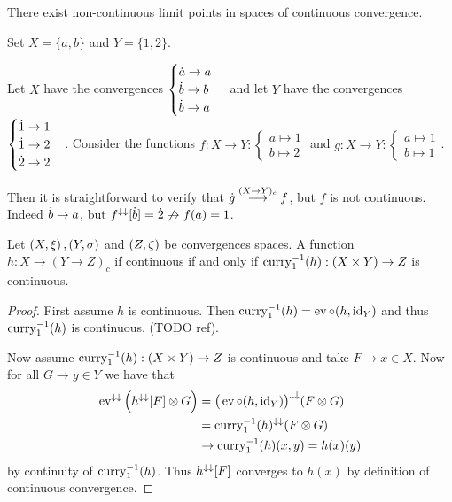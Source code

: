 \begin{example}
There exist non-continuous limit points in spaces of continuous convergence.

Set $X = \{a,b\}$ and $Y = \{1,2\}$.

Let $X$ have the convergences $\begin{cases}
\dot{a} \to a \\
\dot{b} \to b \\
\dot{b} \to a
\end{cases}$ and let $Y$ have the convergences $\begin{cases}
\dot{1} \to 1 \\
\dot{1} \to 2 \\
\dot{2} \to 2
\end{cases}$.
Consider the functions $f: X\to Y: \begin{cases}
a\mapsto 1 \\ b\mapsto 2
\end{cases}$ and $g: X\to Y: \begin{cases}
a\mapsto 1 \\ b\mapsto 1
\end{cases}$.

Then it is straightforward to verify that $\dot{g} \overset{(X\to Y)_c}{\longrightarrow} f$, but $f$ is not continuous. Indeed $\dot{b} \to a$, but $f^{\downarrow\downarrow}[\dot{b}] = \dot{2} \not\to f(a) = 1$.
\end{example}

\begin{proposition} \label{universalPropertyContinuousConvergence}
Let $\left( X, \xi \right), \left( Y,\sigma \right)$ and $\left( Z,\zeta \right)$ be convergences spaces. A function $h: X\to (Y \to Z)_c$ if continuous \textup{if and only if} $\operatorname{curry}_1^{-1}(h): (X\times Y)\to Z$ is continuous.
\end{proposition}
\begin{proof}
First assume $h$ is continuous. Then $\operatorname{curry}_1^{-1}(h) = \operatorname{ev} \circ (h,\operatorname{id}_Y)$ and thus $\operatorname{curry}_1^{-1}(h)$ is continuous. (TODO ref).

Now assume $\operatorname{curry}_1^{-1}(h): (X\times Y)\to Z$ is continuous and take $F\to x\in X$. Now for all $G\to y\in Y$ we have that
\begin{align*}
\operatorname{ev}^{\downarrow\downarrow}\Big(h^{\downarrow\downarrow}[F]\otimes G\Big) &= \big(\operatorname{ev} \circ (h,\operatorname{id}_Y)\big)^{\downarrow\downarrow}(F\otimes G) \\
&= \operatorname{curry}_1^{-1}(h)^{\downarrow\downarrow}(F\otimes G) \\
&\to \operatorname{curry}_1^{-1}(h)(x,y) = h(x)(y)
\end{align*}
by continuity of $\operatorname{curry}_1^{-1}(h)$. Thus $h^{\downarrow\downarrow}[F]$ converges to $h(x)$ by definition of continuous convergence.
\end{proof}

